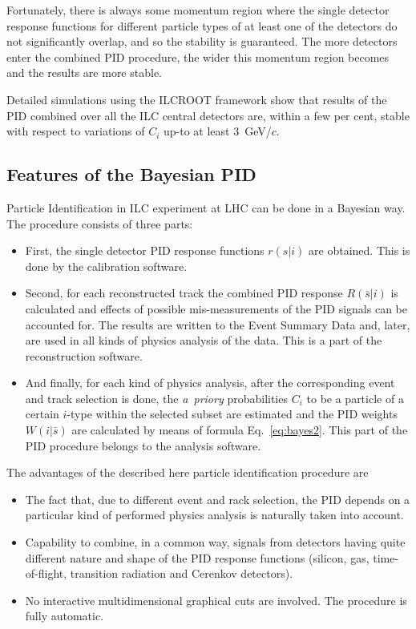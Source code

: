 \documentclass[12pt,a4paper,twoside]{article}
\begin{document}
{Fortunately, there is always some momentum region where the single detector
response functions for different particle types of at least one of the 
detectors do not significantly overlap, and so the stability
is guaranteed. The more detectors enter the combined PID procedure, the wider 
this momentum region becomes and the results are more stable.

Detailed simulations using the ILCROOT framework show that results of the 
PID combined over all the ILC central 
detectors are, within a few per cent, stable with respect to
variations of $C_i$ up-to at least 3~GeV/$c$.


\subsection{Features of the Bayesian PID}
Particle Identification in ILC experiment at LHC can be done in a Bayesian
way. The procedure consists of three parts:
\begin{itemize}
\item First, the single detector PID response functions 
$r(s|i)$ are obtained. This is done  by the calibration software.
\item Second, for each reconstructed track the combined PID response
 $R(\bar{s}|i)$ 
 is calculated and effects of possible mis-measurements of the PID signals
 can be accounted for. The results are written to the Event Summary Data and,
 later, are used in all kinds of physics analysis of the data.
 This is a part of the reconstruction software.
\item And finally, for each kind of physics analysis, after the corresponding
 event and track selection is done, the {\it a~priory} probabilities $C_i$ to 
be a particle of a certain $i$-type within the selected subset are estimated
and the PID weights $W(i|\bar{s})$ are calculated by means of formula
Eq.~\ref{eq:bayes2}. This part of the PID procedure belongs to the
analysis software.  
\end{itemize} 

The advantages of the described here particle identification procedure are
\begin{itemize}
\item The fact that, due to different event and rack selection, the PID depends
on a particular kind of performed physics analysis is naturally taken into 
account.
\item Capability to combine, in a common way, signals from detectors having 
quite different nature and shape of the PID response functions (silicon, gas,
time-of-flight, transition radiation and Cerenkov detectors).
\item No interactive multidimensional graphical cuts are involved. 
 The procedure is fully automatic.


\end{itemize}}
\end{document}
